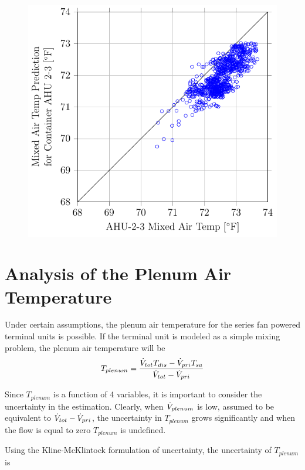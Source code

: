 \begin{figure}
\centering
\includegraphics[]{Plots/2016-09-07-1623-MixedAirTempPredictionforContainerAHU23vsAHU23MixedAirTemp.pdf}
\caption{}
\label{fig:2016-09-07-1623-MixedAirTempPredictionforContainerAHU23vsAHU23MixedAirTemp}
\end{figure}


\section{Analysis of the Plenum Air Temperature}

Under certain assumptions, the plenum air temperature for the series fan
powered terminal units is possible. If the terminal unit is modeled as a simple
mixing problem, the plenum air temperature will be 
\begin{equation}
    T_{plenum}=\frac{\dot{V}_{tot}T_{dis}-\dot{V}_{pri}T_{sa}}{\dot{V}_{tot} -\dot{V}_{pri}}
\end{equation}

Since \(T_{plenum}\) is a function of 4 variables, it is important to
consider the uncertainty in the estimation. Clearly, when
\(\dot{V}_{plenum}\) is low, assumed to be equivalent to \(\dot{V}_{tot} -
\dot{V}_{pri}\), the uncertainty in  \(T_{plenum}\) grows significantly and
when the flow is equal to zero \(T_{plenum}\) is undefined. 

Using the Kline-McKlintock formulation of uncertainty, the uncertainty
of \(T_{plenum}\) is 

